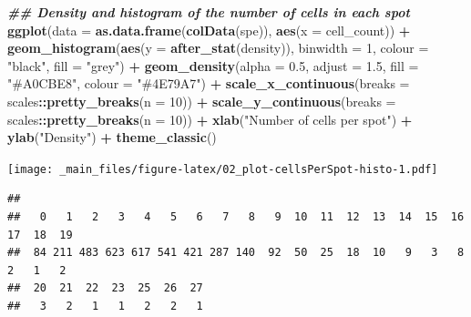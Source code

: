 \documentclass[
]{book}
\newenvironment{Shaded}{\begin{snugshade}}{\end{snugshade}}
\newcommand{\AttributeTok}[1]{\textcolor[rgb]{0.13,0.29,0.53}{#1}}
\newcommand{\DecValTok}[1]{\textcolor[rgb]{0.00,0.00,0.81}{#1}}
\newcommand{\DocumentationTok}[1]{\textcolor[rgb]{0.56,0.35,0.01}{\textbf{\textit{#1}}}}
\newcommand{\FloatTok}[1]{\textcolor[rgb]{0.00,0.00,0.81}{#1}}
\newcommand{\FunctionTok}[1]{\textcolor[rgb]{0.13,0.29,0.53}{\textbf{#1}}}
\newcommand{\NormalTok}[1]{#1}
\newcommand{\SpecialCharTok}[1]{\textcolor[rgb]{0.81,0.36,0.00}{\textbf{#1}}}
\newcommand{\StringTok}[1]{\textcolor[rgb]{0.31,0.60,0.02}{#1}}
\begin{document}
\begin{Shaded}
\begin{Highlighting}[]
\DocumentationTok{\#\# Density and histogram of the number of cells in each spot}
\FunctionTok{ggplot}\NormalTok{(}\AttributeTok{data =} \FunctionTok{as.data.frame}\NormalTok{(}\FunctionTok{colData}\NormalTok{(spe)),}
       \FunctionTok{aes}\NormalTok{(}\AttributeTok{x =}\NormalTok{ cell\_count)) }\SpecialCharTok{+}
  \FunctionTok{geom\_histogram}\NormalTok{(}\FunctionTok{aes}\NormalTok{(}\AttributeTok{y =} \FunctionTok{after\_stat}\NormalTok{(density)), }
                 \AttributeTok{binwidth =} \DecValTok{1}\NormalTok{,}
                 \AttributeTok{colour =} \StringTok{"black"}\NormalTok{, }
                 \AttributeTok{fill =} \StringTok{"grey"}\NormalTok{) }\SpecialCharTok{+}
  \FunctionTok{geom\_density}\NormalTok{(}\AttributeTok{alpha =} \FloatTok{0.5}\NormalTok{,}
               \AttributeTok{adjust =} \FloatTok{1.5}\NormalTok{,}
               \AttributeTok{fill =} \StringTok{"\#A0CBE8"}\NormalTok{,}
               \AttributeTok{colour =} \StringTok{"\#4E79A7"}\NormalTok{) }\SpecialCharTok{+}
  \FunctionTok{scale\_x\_continuous}\NormalTok{(}\AttributeTok{breaks =}\NormalTok{ scales}\SpecialCharTok{::}\FunctionTok{pretty\_breaks}\NormalTok{(}\AttributeTok{n =} \DecValTok{10}\NormalTok{)) }\SpecialCharTok{+} 
  \FunctionTok{scale\_y\_continuous}\NormalTok{(}\AttributeTok{breaks =}\NormalTok{ scales}\SpecialCharTok{::}\FunctionTok{pretty\_breaks}\NormalTok{(}\AttributeTok{n =} \DecValTok{10}\NormalTok{)) }\SpecialCharTok{+} 
  \FunctionTok{xlab}\NormalTok{(}\StringTok{"Number of cells per spot"}\NormalTok{) }\SpecialCharTok{+} 
  \FunctionTok{ylab}\NormalTok{(}\StringTok{"Density"}\NormalTok{) }\SpecialCharTok{+} 
  \FunctionTok{theme\_classic}\NormalTok{()}
\end{Highlighting}
\end{Shaded}

\texttt{[image: \_main\_files/figure-latex/02\_plot-cellsPerSpot-histo-1.pdf]}

\begin{Shaded}
\end{Shaded}

\begin{verbatim}
## 
##   0   1   2   3   4   5   6   7   8   9  10  11  12  13  14  15  16  17  18  19 
##  84 211 483 623 617 541 421 287 140  92  50  25  18  10   9   3   8   2   1   2 
##  20  21  22  23  25  26  27 
##   3   2   1   1   2   2   1
\end{verbatim}
\end{document}
